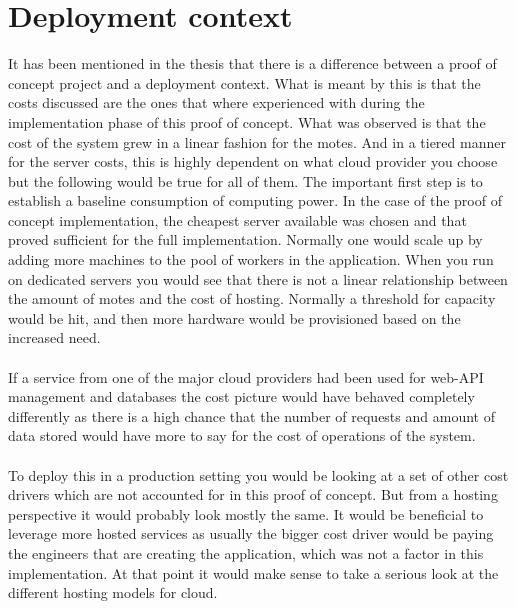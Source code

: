 \documentclass[]{uiophd}
\begin{document}
\section{Deployment context}
It has been mentioned in the thesis that there is a difference between a proof of concept project and a deployment context. What is meant by this is that the costs discussed are the ones that where experienced with during the implementation phase of this proof of concept. What was observed is that the cost of the system grew in a linear fashion for the motes. And in a tiered manner for the server costs, this is highly dependent on what cloud provider you choose but the following would be true for all of them. The important first step is to establish a baseline consumption of computing power. In the case of the proof of concept implementation, the cheapest server available was chosen and that proved sufficient for the full implementation. Normally one would scale up by adding more machines to the pool of workers in the application. When you run on dedicated servers you would see that there is not a linear relationship between the amount of motes and the cost of hosting. Normally a threshold for capacity would be hit, and then more hardware would be provisioned based on the increased need.
\\\\
If a service from one of the major cloud providers had been used for web-API management and databases the cost picture would have behaved completely differently as there is a high chance that the number of requests and amount of data stored would have more to say for the cost of operations of the system.
\\\\
To deploy this in a production setting you would be looking at a set of other cost drivers which are not accounted for in this proof of concept. But from a hosting perspective it would probably look mostly the same. It would be beneficial to leverage more hosted services as usually the bigger cost driver would be paying the engineers that are creating the application, which was not a factor in this implementation. At that point it would make sense to take a serious look at the different hosting models for cloud.
\\\\
\end{document}
